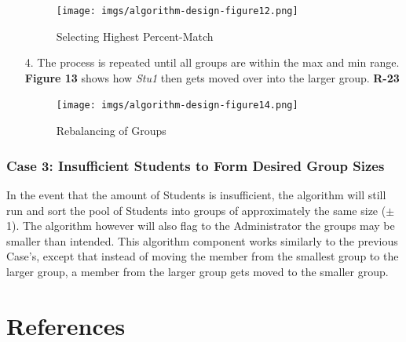 \documentclass[12pt,letterpaper]{article}
\begin{document}
\begin{enumerate}
\begin{figure}[H]
	\caption{Selecting Highest Percent-Match}
	\begin{center}
		\texttt{[image: imgs/algorithm-design-figure12.png]}
	\end{center}
\end{figure}
	\item[4.] The process is repeated until all groups are within the max and min range. {\bf Figure 13} shows how {\it Stu1} then gets moved over into the larger group. {\bf R-23}
\begin{figure}[H]
	\caption{Rebalancing of Groups}
	\begin{center}
		\texttt{[image: imgs/algorithm-design-figure14.png]}
	\end{center}
\end{figure}
\end{enumerate}

\subsubsection{Case 3: Insufficient Students to Form Desired Group Sizes}

In the event that the amount of Students is insufficient, the algorithm will still run and sort the pool of Students into groups of approximately the same size ($\pm$ 1). The algorithm however will also flag to the Administrator the groups may be smaller than intended. This algorithm component works similarly to the previous Case's, except that instead of moving the member from the smallest group to the larger group, a member from the larger group gets moved to the smaller group.

\renewcommand\refname{\vskip -1cm}
\section{References}
\end{document}
